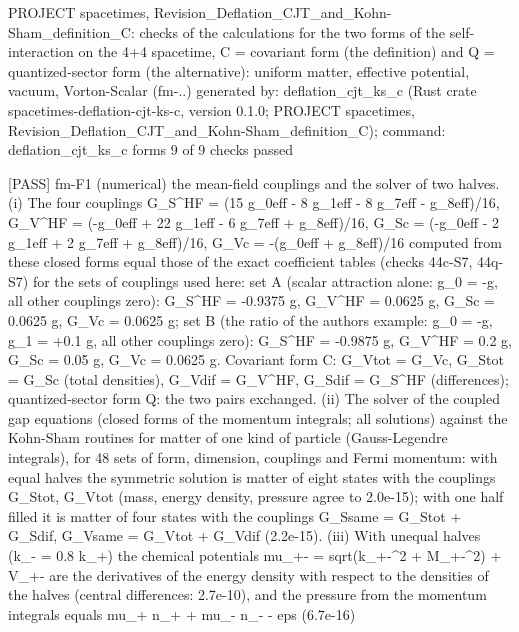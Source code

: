 \documentclass[
  10pt,
]{article}
\newenvironment{Shaded}{}{}
\newcommand{\NormalTok}[1]{#1}
\begin{document}
\begin{Shaded}
\begin{Highlighting}[]
\NormalTok{PROJECT spacetimes, Revision\_Deflation\_CJT\_and\_Kohn{-}Sham\_definition\_C: checks of the calculations for the two forms of the self{-}interaction on the 4+4 spacetime, C = covariant form (the definition) and Q = quantized{-}sector form (the alternative): uniform matter, effective potential, vacuum, Vorton{-}Scalar (fm{-}..)}
\NormalTok{generated by: deflation\_cjt\_ks\_c (Rust crate spacetimes{-}deflation{-}cjt{-}ks{-}c, version 0.1.0; PROJECT spacetimes, Revision\_Deflation\_CJT\_and\_Kohn{-}Sham\_definition\_C); command: deflation\_cjt\_ks\_c forms}
\NormalTok{9 of 9 checks passed}

\NormalTok{[PASS] fm{-}F1  (numerical) the mean{-}field couplings and the solver of two halves. (i) The four couplings G\_S\^{}HF = (15 g\_0eff {-} 8 g\_1eff {-} 8 g\_7eff {-} g\_8eff)/16, G\_V\^{}HF = ({-}g\_0eff + 22 g\_1eff {-} 6 g\_7eff + g\_8eff)/16, G\_Sc = ({-}g\_0eff {-} 2 g\_1eff + 2 g\_7eff + g\_8eff)/16, G\_Vc = {-}(g\_0eff + g\_8eff)/16 computed from these closed forms equal those of the exact coefficient tables (checks 44c{-}S7, 44q{-}S7) for the sets of couplings used here: set A (scalar attraction alone: g\_0 = {-}g, all other couplings zero): G\_S\^{}HF = {-}0.9375 g, G\_V\^{}HF = 0.0625 g, G\_Sc = 0.0625 g, G\_Vc = 0.0625 g; set B (the ratio of the author\textquotesingle{}s example: g\_0 = {-}g, g\_1 = +0.1 g, all other couplings zero): G\_S\^{}HF = {-}0.9875 g, G\_V\^{}HF = 0.2 g, G\_Sc = 0.05 g, G\_Vc = 0.0625 g. Covariant form C: G\_Vtot = G\_Vc, G\_Stot = G\_Sc (total densities), G\_Vdif = G\_V\^{}HF, G\_Sdif = G\_S\^{}HF (differences); quantized{-}sector form Q: the two pairs exchanged. (ii) The solver of the coupled gap equations (closed forms of the momentum integrals; all solutions) against the Kohn{-}Sham routines for matter of one kind of particle (Gauss{-}Legendre integrals), for 48 sets of form, dimension, couplings and Fermi momentum: with equal halves the symmetric solution is matter of eight states with the couplings G\_Stot, G\_Vtot (mass, energy density, pressure agree to 2.0e{-}15); with one half filled it is matter of four states with the couplings G\_Ssame = G\_Stot + G\_Sdif, G\_Vsame = G\_Vtot + G\_Vdif (2.2e{-}15). (iii) With unequal halves (k\_{-} = 0.8 k\_+) the chemical potentials mu\_+{-} = sqrt(k\_+{-}\^{}2 + M\_+{-}\^{}2) + V\_+{-} are the derivatives of the energy density with respect to the densities of the halves (central differences: 2.7e{-}10), and the pressure from the momentum integrals equals mu\_+ n\_+ + mu\_{-} n\_{-} {-} eps (6.7e{-}16)}

\end{Highlighting}
\end{Shaded}
\end{document}
